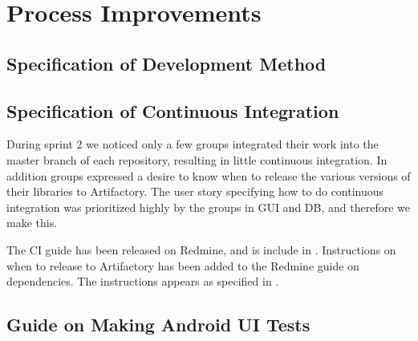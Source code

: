 \chapter{Process Improvements}
\dummy

\section{Specification of Development Method}
\dummy

\section{Specification of Continuous Integration}
During sprint 2 we noticed only a few groups integrated their work into the master branch of each repository, resulting in little continuous integration. In addition groups expressed a desire to know when to release the various versions of their libraries to Artifactory. The user story specifying how to do continuous integration was prioritized highly by the groups in GUI and DB, and therefore we make this.

The CI guide has been released on Redmine, and is include in . Instructions on when to release to Artifactory has been added to the Redmine guide on dependencies. The instructions appears as specified in .

\section{Guide on Making Android UI Tests}
\dummy